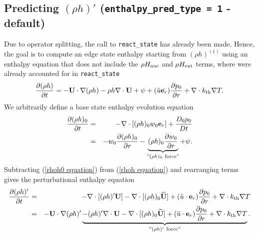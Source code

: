 \subsection{Predicting $(\rho h)'$ ({\tt enthalpy\_pred\_type = 1} - default)}
Due to operator splitting, the call to {\tt react\_state} has already
been made.  Hence, the goal is to compute an edge state enthalpy
starting from $(\rho h)^{(1)}$ using an enthalpy equation that does
not include the $\rho H_{\rm nuc}$ and $\rho H_{\rm ext}$ terms, where
were already accounted for in {\tt react\_state}
\begin{equation}
\frac{\partial(\rho h)}{\partial t} = -{\bf U}\cdot\nabla(\rho h) - \rho h\nabla\cdot{\bf U} 
+ \psi + (\tilde{u} \dot {\mathbf{e}_r}) \frac{\partial p_0}{\partial r} + \nabla\cdot k_{\rm th}\nabla T. \label{rhoh equation}
\end{equation}
We arbitrarily define a base state enthalpy evolution equation
\begin{eqnarray}
\frac{\partial(\rho h)_0}{\partial t} &=& -\nabla\cdot[(\rho h)_0 w_0{\bf e}_r] 
+ \frac{D_0p_0}{Dt} \nonumber \\
&=& -w_0\frac{\partial(\rho h)_0}{\partial r} 
- \underbrace{(\rho h)_0\frac{\partial w_0}{\partial r}}_{"(\rho h)_0 ~ \text{force}"}
+ \psi.\label{rhoh0 equation}
\end{eqnarray}
Subtracting (\ref{rhoh0 equation}) from (\ref{rhoh equation}) and rearranging terms gives 
the perturbational enthalpy equation
\begin{eqnarray}
\frac{\partial(\rho h)'}{\partial t} &=& -\nabla\cdot[(\rho h)'{\bf U}] 
- \nabla\cdot[(\rho h)_0\widetilde{{\bf U}}] + (\tilde{u} \cdot \mathbf{e}_r)\frac{\partial p_0}{\partial r} 
+ \nabla\cdot k_{\rm th}\nabla T\nonumber \\
&=& -{\bf U}\cdot\nabla(\rho h)' \underbrace{- (\rho h)'\nabla\cdot{\bf U} 
- \nabla\cdot[(\rho h)_0\widetilde{{\bf U}}] + (\tilde{u} \cdot \mathbf{e}_r)\frac{\partial p_0}{\partial r}
+ \nabla\cdot k_{\rm th}\nabla T}_{"(\rho h)' ~ \text{force}"}. \label{rhohprime equation}
\end{eqnarray}

